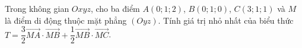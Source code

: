 \begin{ex}
Trong không gian $Oxyz$, cho ba điểm $A(0;1;2)$, $B(0;1;0)$, $C(3;1;1)$ và $M$ là điểm di động thuộc mặt phẳng $(Oyz)$. Tính giá trị nhỏ nhất của biểu thức $T=\dfrac32\overrightarrow{MA}\cdot\overrightarrow{MB}+\dfrac12\overrightarrow{MB}\cdot\overrightarrow{MC}$.
\end{ex}
